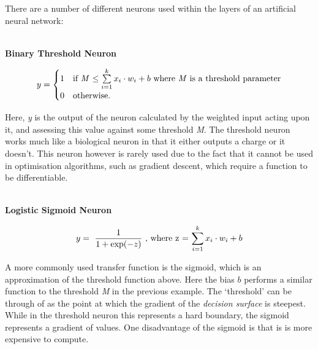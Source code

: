 \documentclass[a4paper,11pt,titlepage]{article}
\begin{document}
There are a number of different neurons used within the layers of an artificial neural network:
		\\\
		
		\textbf{Binary Threshold Neuron} 
		
		$$
		y = \begin{cases}
		1 & \text{if \textit{M} $\le \sum\limits_{i=1}^k x_{i} \cdot w_{i} + b $ where \textit{M} is a threshold parameter} \\
		0 & \text{otherwise.}
		\end{cases}
		$$

		Here, \textit{y} is the output of the neuron calculated by the weighted input acting upon it, and assessing this value against some threshold \textit{M}. The threshold neuron works much like a biological neuron in that it either outputs a charge or it doesn't. This neuron however is rarely used due to the fact that it cannot be used in optimisation algorithms, such as gradient descent, which require a function to be differentiable. 
	\\\

		\textbf{Logistic Sigmoid Neuron}	
		
		$$
		y = 
		\text{ $ \frac{1}{1 + \exp (-z)} $
		, where z = $ \sum\limits_{i=1}^k x_{i} \cdot w_{i} + b $}
		$$ 
		
		A more commonly used transfer function is the sigmoid, which is an approximation of the threshold function above. Here the bias $ b $ performs a similar function to the threshold \textit{M} in the previous example. The `threshold' can be through of as the point at which the gradient of the \textit{decision surface} is steepest. While in the threshold neuron this represents a hard boundary, the sigmoid represents a gradient of values. One disadvantage of the sigmoid is that is is more expensive to compute.
		
		\begin{figure}[H]
    			\centering	
    			\qquad
    			\qquad
    			\caption{}%
    			\label{fig:SigmoidNeurons}
		\end{figure}
\end{document}
